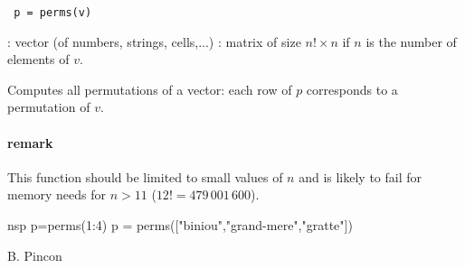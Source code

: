 
\begin{mandesc}
\end{mandesc}

\begin{calling_sequence}
\begin{verbatim}
 p = perms(v)
\end{verbatim}
\end{calling_sequence}

\begin{parameters}
  \begin{varlist}
   : vector (of numbers, strings, cells,...)
   : matrix of size $n! \times n$ if $n$ is the number of
               elements of $v$.
  \end{varlist}
\end{parameters}

\begin{mandescription}
  Computes all permutations of a vector: each row of $p$
  corresponds to a permutation of $v$. 

\paragraph{remark}
This function should be limited to small values of $n$ and is likely
to fail for memory needs for $n > 11$ ($12! = 479\,001\,600$).

\end{mandescription}

\begin{examples}
\begin{mintednsp}{nsp}
p=perms(1:4)
p = perms(["biniou","grand-mere","gratte"])
\end{mintednsp}
\end{examples}


\begin{manseealso}
\end{manseealso}

\begin{authors}
B. Pincon
\end{authors}

